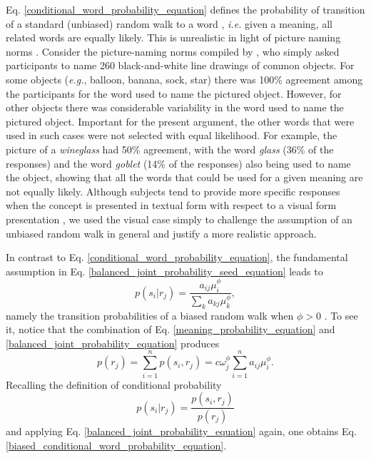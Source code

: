 \documentclass{article}
\begin{document}
Eq. \ref{conditional_word_probability_equation} defines the probability of transition of a standard (unbiased) random walk to a word \cite{Noh2004a}, {\em i.e.}
given a meaning, all related words are equally likely. This is unrealistic in light of picture naming norms \cite{Snodgrass1980a,Dunabeitia2017a}. Consider the picture-naming norms compiled by , who simply asked participants to name 260 black-and-white line drawings of common objects. For some objects ({\em e.g.}, balloon, banana, sock, star) there was 100\% agreement among the participants for the word used to name the pictured object. However, for other objects there was considerable variability in the word used to name the pictured object. Important for the present argument, the other words that were used in such cases were not selected with equal likelihood. For example, the picture of a {\em wineglass} had 50\% agreement, with the word {\em glass} (36\% of the responses) and the word {\em goblet} (14\% of the responses) also being used to name the object, showing that all the words that could be used for a given meaning are not equally likely. 
Although subjects tend to provide more specific responses when the concept is presented in textual form with respect to a visual form presentation \cite{Tversky1983a}, %
we used the visual case simply to challenge the assumption of an unbiased random walk in general and justify a more realistic approach.

In contrast to Eq. \ref{conditional_word_probability_equation}, the fundamental assumption in Eq. \ref{balanced_joint_probability_seed_equation} leads to 
\begin{equation}
p(s_i | r_j) = \frac{a_{ij}\mu_i^\phi}{\sum_{k}a_{kj}\mu_k^\phi},
\label{biased_conditional_word_probability_equation}
\end{equation}
namely the transition probabilities of a biased random walk when $\phi > 0$ \cite{Sinatra2011a,Gomez-Gardenes2008a}. To see it, notice that the combination of Eq. \ref{meaning_probability_equation} and \ref{balanced_joint_probability_equation} produces 
\begin{equation}
p(r_j) = \sum_{i=1}^n p(s_i, r_j) = c \omega_j^\phi \sum_{i=1}^n a_{ij}\mu_i^\phi.
\label{biased_meaning_probability_equation}
\end{equation}
Recalling the definition of conditional probability 
\begin{equation*}
p(s_i | r_j) = \frac{p(s_i, r_j)}{p(r_j)}
\end{equation*}
and applying Eq. \ref{balanced_joint_probability_equation} again, one obtains Eq. \ref{biased_conditional_word_probability_equation}. 
\end{document}
